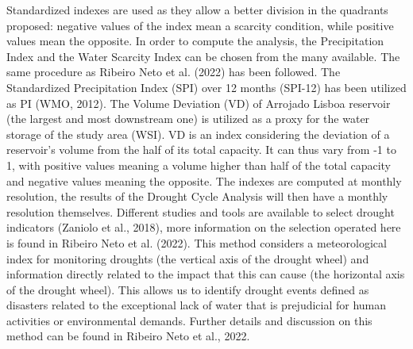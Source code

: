 \documentclass[draft]{agujournal2019}
\begin{document}
Standardized indexes are used as they allow a better division in the quadrants proposed: negative values of the index mean a scarcity condition, while positive values mean the opposite. In order to compute the analysis, the Precipitation Index and the Water Scarcity Index can be chosen from the many available. The same procedure as Ribeiro Neto et al. (2022) has been followed. The Standardized Precipitation Index (SPI) over 12 months (SPI-12) has been utilized as PI (WMO, 2012). The Volume Deviation (VD) of Arrojado Lisboa reservoir (the largest and most downstream one) is utilized as a proxy for the water storage of the study area (WSI). VD is an index considering the deviation of a reservoir’s volume from the half of its total capacity. It can thus vary from -1 to 1, with positive values meaning a volume higher than half of the total capacity and negative values meaning the opposite. The indexes are computed at monthly resolution, the results of the Drought Cycle Analysis will then have a monthly resolution themselves. Different studies and tools are available to select drought indicators (Zaniolo et al., 2018), more information on the selection operated here is found in Ribeiro Neto et al. (2022). This method considers a meteorological index for monitoring droughts (the vertical axis of the drought wheel) and information directly related to the impact that this can cause (the horizontal axis of the drought wheel). This allows us to identify drought events defined as disasters related to the exceptional lack of water that is prejudicial for human activities or environmental demands. Further details and discussion on this method can be found in Ribeiro Neto et al., 2022.
\end{document}
